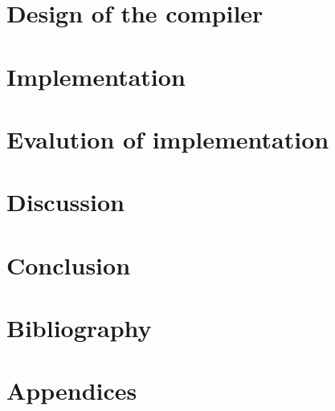 \documentclass{article}
\begin{document}
\section{Design of the compiler}
\label{sec:compiler-design}

\clearpage

\section{Implementation}
\label{sec:impl}

\clearpage

\section{Evalution of implementation}
\label{sec:evaluation}

\clearpage

\section{Discussion}
\label{sec:discussion}

\clearpage

\section{Conclusion}
\label{sec:conclusion}

\clearpage

\section{Bibliography}
\label{sec:biblio}

\clearpage

\section{Appendices}
\label{sec:appendix}

\end{document}
